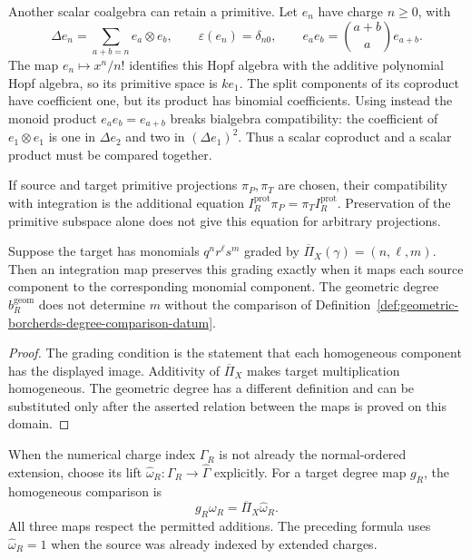 Another scalar coalgebra can retain a primitive. Let $e_n$ have
charge $n\geq0$, with
\[
 \Delta e_n=\sum_{a+b=n}e_a\otimes e_b,\qquad
 \varepsilon(e_n)=\delta_{n0},\qquad
 e_a e_b=\binom{a+b}{a}e_{a+b}.
\]
The map $e_n\mapsto x^n/n!$ identifies this Hopf algebra with
the additive polynomial Hopf algebra, so its primitive space is
$k e_1$. The split components of its coproduct have coefficient
one, but its product has binomial coefficients. Using instead
the monoid product $e_ae_b=e_{a+b}$ breaks bialgebra compatibility:
the coefficient of $e_1\otimes e_1$ is one in $\Delta e_2$
and two in $(\Delta e_1)^2$. Thus a scalar coproduct and a
scalar product must be compared together.

If source and target primitive projections $\pi_P,\pi_T$ are
chosen, their compatibility with integration is the additional
equation $I_R^{\mathrm{prot}}\pi_P=\pi_T I_R^{\mathrm{prot}}$.
Preservation of the primitive subspace alone does not give this
equation for arbitrary projections.

\begin{proposition}
\label{prop:protected-integration-gram-degree}
\label{prop:protected-integration-pi-x-separation}
Suppose the target has monomials $q^nr^\ell s^m$ graded by
$\overline\Pi_X(\gamma)=(n,\ell,m)$. Then an integration map
preserves this grading exactly when it maps each source component
to the corresponding monomial component. The geometric degree
$b_R^{\mathrm{geom}}$ does not determine $m$ without the
comparison of Definition~\ref{def:geometric-borcherds-degree-comparison-datum}.
\end{proposition}

\begin{proof}
The grading condition is the statement that each homogeneous
component has the displayed image. Additivity of
$\overline\Pi_X$ makes target multiplication homogeneous.
The geometric degree has a different definition and can be
substituted only after the asserted relation between the maps is
proved on this domain.
\end{proof}

When the numerical charge index $\Gamma_R$ is not already the
normal-ordered extension, choose its lift
$\widehat\omega_R:\Gamma_R\to\widehat\Gamma$ explicitly.
For a target degree map $g_R$, the homogeneous comparison is
\[
 g_R\omega_R=\overline\Pi_X\widehat\omega_R.
\]
All three maps respect the permitted additions. The preceding
formula uses $\widehat\omega_R=1$ when the source was already
indexed by extended charges.

